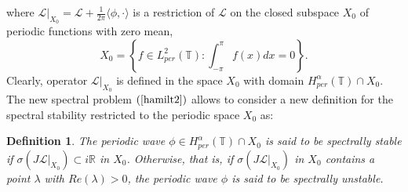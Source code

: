 \documentclass[12pt,reqno]{amsart}
\newcommand{\2}{L^2_{per}(0, T)}
\numberwithin{equation}{section}
\numberwithin{figure}{section}
\newtheorem{definition}[theorem]{Definition}
\begin{document}
where $\mathcal{L}|_{X_0}=\mathcal{L}+\frac{1}{2\pi}\langle\phi,\cdot\rangle$ is a restriction of $\mathcal{L}$ on the closed subspace $X_0$ of periodic functions with zero mean,
	\begin{equation}
	\displaystyle X_0 = \left\{f \in L^2_{per}(\mathbb{T}): \int_{-\pi}^{\pi} f(x)dx =0 \right\}.
	\end{equation}
Clearly, operator $\mathcal{L}|_{X_0}$ is defined in the space $X_0$ with domain $H_{per}^{\alpha}(\mathbb{T})\cap X_0$. The new spectral problem $(\ref{hamilt2})$ allows to consider a new definition for the spectral stability restricted to the periodic space $X_0$ as:
\begin{definition}\label{defistab1}
	The periodic wave $\phi \in H^{\alpha}_{per}(\mathbb{T})\cap X_0$ is said to be spectrally stable if $\sigma(J\mathcal{L}|_{X_0}) \subset i\mathbb{R}$ in  $X_0$. Otherwise, that is, if $\sigma(J\mathcal{L}|_{X_0})$ in $X_0$ contains a point $\lambda$ with $Re(\lambda)>0$, the periodic wave $\phi$ is said to be spectrally unstable.
\end{definition}
\end{document}
